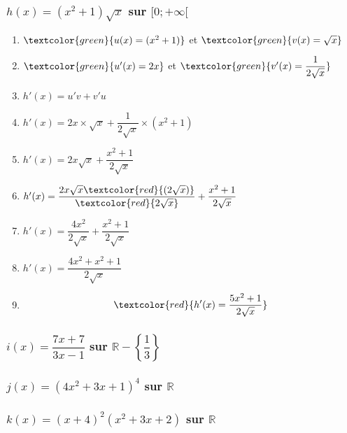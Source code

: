\documentclass[t]{beamer}
\begin{document}
	\begin{frame}
		\frametitle{$h(x) = (x^2+1)\sqrt{x} $ sur $[0;+\infty[$}
		\pause
		\begin{enumerate}[]
			\item $\textcolor{green}{u(x) = (x^2+1)}$ et $\textcolor{green}{v(x) = \sqrt{x}} $ 
			\pause
			\item $\textcolor{green}{u'(x) = 2x}$ et $\textcolor{green}{v'(x) = \dfrac{1}{2\sqrt{x}}} $ 
			\pause
			\item \(h'(x) = u'v + v'u \)
			\pause
			\item \(h'(x) = 2x \times \sqrt{x} +  \dfrac{1}{2\sqrt{x}} \times (x^2+1) \)
			\pause
			\item \(h'(x) = 2x\sqrt{x} +  \dfrac{x^2+1}{2\sqrt{x}}\)
			\pause
			\item \(h'(x) = \dfrac{2x\sqrt{x}\textcolor{red}{(2\sqrt{x})}}{\textcolor{red}{2\sqrt{x}}} +  \dfrac{x^2+1}{2\sqrt{x}}\)
			\pause
			\item \(h'(x) = \dfrac{4x^2}{2\sqrt{x}} +  \dfrac{x^2+1}{2\sqrt{x}}\)
			\pause
			\item \(h'(x) = \dfrac{4x^2 + x^2+1}{2\sqrt{x}}\)
			\pause
			\item \[\textcolor{red}{h'(x) = \dfrac{5x^2+1}{2\sqrt{x}}}\]
		\end{enumerate}
	\end{frame}

	\begin{frame}
		\frametitle{$i(x) = \dfrac{7x+7}{3x-1} $ sur $\mathbb{R} - \left\lbrace  \dfrac{1}{3} \right\rbrace $}
	\end{frame}

	\begin{frame}
		\frametitle{$j(x) = (4x^2+3x+1)^4$ sur $\mathbb{R}$}
	\end{frame}

	\begin{frame}
		\frametitle{ $k(x) = (x+4)^2 (x^2+3x+2) $ sur $\mathbb{R}$}
	\end{frame}
\end{document}
